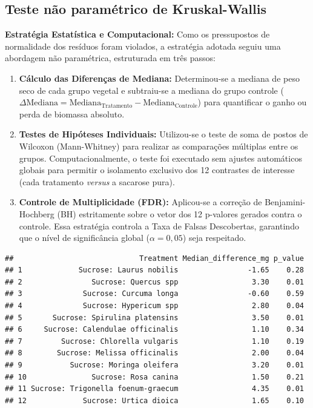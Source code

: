 \documentclass[
  brazilian,
  12pt,
  a4paper,
]{article}
\begin{document}
\subsection{Teste não paramétrico de
Kruskal-Wallis}\label{teste-nuxe3o-paramuxe9trico-de-kruskal-wallis}

\textbf{Estratégia Estatística e Computacional:} Como os pressupostos de
normalidade dos resíduos foram violados, a estratégia adotada seguiu uma
abordagem não paramétrica, estruturada em três passos:

\begin{enumerate}
    \item \textbf{Cálculo das Diferenças de Mediana:} Determinou-se a mediana de peso seco de cada grupo vegetal e subtraiu-se a mediana do grupo controle ($\Delta\text{Mediana} = \text{Mediana}_{\text{Tratamento}} - \text{Mediana}_{\text{Controle}}$) para quantificar o ganho ou perda de biomassa absoluto.
    \item \textbf{Testes de Hipóteses Individuais:} Utilizou-se o teste de soma de postos de Wilcoxon (Mann-Whitney) para realizar as comparações múltiplas entre os grupos. Computacionalmente, o teste foi executado sem ajustes automáticos globais para permitir o isolamento exclusivo dos 12 contrastes de interesse (cada tratamento \textit{versus} a sacarose pura).
    \item \textbf{Controle de Multiplicidade (FDR):} Aplicou-se a correção de Benjamini-Hochberg (BH) estritamente sobre o vetor dos 12 p-valores gerados contra o controle. Essa estratégia controla a Taxa de Falsas Descobertas, garantindo que o nível de significância global ($\alpha = 0,05$) seja respeitado.
\end{enumerate}

\begin{verbatim}
##                             Treatment Median_difference_mg p_value
## 1             Sucrose: Laurus nobilis                -1.65    0.28
## 2                Sucrose: Quercus spp                 3.30    0.01
## 3              Sucrose: Curcuma longa                -0.60    0.59
## 4              Sucrose: Hypericum spp                 2.80    0.04
## 5       Sucrose: Spirulina platensins                 3.50    0.01
## 6     Sucrose: Calendulae officinalis                 1.10    0.34
## 7         Sucrose: Chlorella vulgaris                 1.10    0.19
## 8        Sucrose: Melissa officinalis                 2.00    0.04
## 9           Sucrose: Moringa oleifera                 3.20    0.01
## 10               Sucrose: Rosa canina                 1.50    0.21
## 11 Sucrose: Trigonella foenum-graecum                 4.35    0.01
## 12             Sucrose: Urtica dioica                 1.65    0.10
\end{verbatim}
\end{document}
